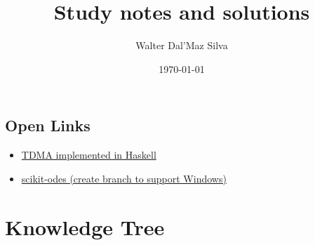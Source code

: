 \documentclass{article}
\title{Study notes and solutions}
\author{Walter Dal'Maz Silva}
\date{\today}
\begin{document}
\maketitle
\tableofcontents
\clearpage



\subsection{Open Links}

\begin{itemize}
	\item\href{https://zims-en.kiwix.campusafrica.gos.orange.com/wikibooks_en_all_maxi/A/Algorithm_Implementation/Linear_Algebra/Tridiagonal_matrix_algorithm}
	{TDMA implemented in Haskell}
	\item\href{https://github.com/bmcage/odes}
	{scikit-odes (create branch to support Windows)}
\end{itemize}






\section{Knowledge Tree}
\end{document}

